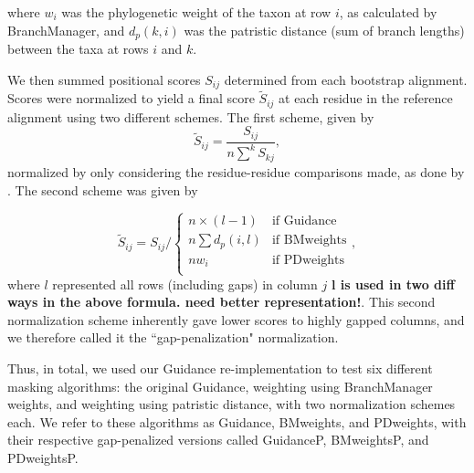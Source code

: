 \documentclass[10pt]{article}
\begin{document}
where $w_i$ was the phylogenetic weight of the taxon at row $i$, as calculated by BranchManager, and $d_p(k,i)$ was the patristic distance (sum of branch lengths) between the taxa at rows $i$ and $k$. 

We then summed positional scores $S_{ij}$ determined from each bootstrap alignment. Scores were normalized to yield a final score $\widetilde{S}_{ij}$ at each residue in the reference alignment using two different schemes. The first scheme, given by \begin{equation} \widetilde{S}_{ij} = \frac{S_{ij}}{n\sum\limits_{}^k S_{kj}}, \end{equation} normalized by only considering the residue-residue comparisons made, as done by \citep{Penn2010}. The second scheme was given by 

\begin{equation} \widetilde{S}_{ij} = S_{ij} \bigg/ \left\{ \begin{array}{rl}
              n\times (l-1)                                   &\mbox{if Guidance} \\
              n\sum d_p(i,l)                         &\mbox{if BMweights} \\
   		  nw_i                                       &\mbox{if PDweights} \\          
         \end{array} \right.,
\end{equation}
where $l$ represented all rows (including gaps) in column $j$ \textbf{l is used in two diff ways in the above formula. need better representation!}. This second normalization scheme inherently gave lower scores to highly gapped columns, and we therefore called it the ``gap-penalization" normalization.

Thus, in total, we used our Guidance re-implementation to test six different masking algorithms: the original Guidance, weighting using BranchManager weights, and weighting using patristic distance, with two normalization schemes each. We refer to these algorithms as Guidance, BMweights, and PDweights, with their respective gap-penalized versions called GuidanceP, BMweightsP, and PDweightsP.
\end{document}
